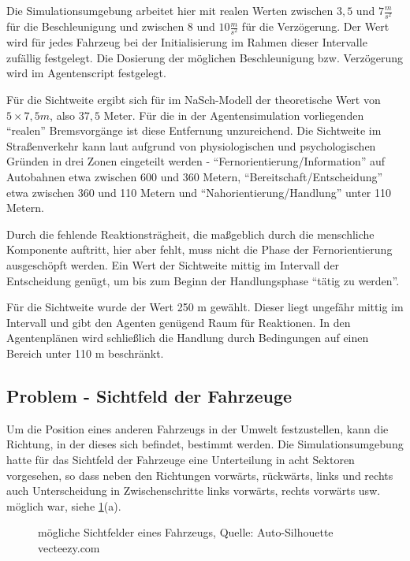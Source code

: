 Die Simulationsumgebung arbeitet hier mit realen Werten zwischen $3,5$ und $7 \frac{m}{s^{2}}$ für die Beschleunigung und zwischen $8$ und $10 \frac{m}{s^{2}}$ für die Verzögerung.
Der Wert wird für jedes Fahrzeug bei der Initialisierung im Rahmen dieser Intervalle zufällig festgelegt.
Die Dosierung der möglichen Beschleunigung bzw. Verzögerung wird im Agentenscript festgelegt.

Für die Sichtweite ergibt sich für im NaSch-Modell der theoretische Wert von $5 \times 7,5 m$, also $37,5$ Meter.
Für die in der Agentensimulation vorliegenden \enquote{realen} Bremsvorgänge ist diese Entfernung unzureichend. 
Die Sichtweite im Straßenverkehr kann laut \cite{sichtweite} aufgrund von physiologischen und psychologischen Gründen in drei Zonen eingeteilt werden - \enquote{Fernorientierung/Information} auf Autobahnen etwa zwischen 600 und 360 Metern, \enquote{Bereitschaft/Entscheidung} etwa zwischen 360 und 110 Metern und \enquote{Nahorientierung/Handlung} unter 110 Metern.

Durch die fehlende Reaktionsträgheit, die maßgeblich durch die menschliche Komponente auftritt, hier aber fehlt, muss nicht die Phase der Fernorientierung ausgeschöpft werden. 
Ein Wert der Sichtweite mittig im Intervall der Entscheidung genügt, um bis zum Beginn der Handlungsphase \enquote{tätig zu werden}.

Für die Sichtweite wurde der Wert 250 m gewählt.
Dieser liegt ungefähr mittig im Intervall und gibt den Agenten genügend Raum für Reaktionen. 
In den Agentenplänen wird schließlich die Handlung durch Bedingungen auf einen Bereich unter 110 m beschränkt.



\subsection{Problem - Sichtfeld der Fahrzeuge}

Um die Position eines anderen Fahrzeugs in der Umwelt festzustellen, kann die Richtung, in der dieses sich befindet, bestimmt werden.
Die Simulationsumgebung hatte für das Sichtfeld der Fahrzeuge eine Unterteilung in acht Sektoren vorgesehen, so dass neben den Richtungen vorwärts, rückwärts, links und rechts auch Unterscheidung in Zwischenschritte links vorwärts, rechts vorwärts usw. möglich war, siehe \cref{figure:car-view-sectors}(a).

\begin{figure}[hptb]
  \centering 
   \qquad 
   \qquad 
  \caption{mögliche Sichtfelder eines Fahrzeugs, Quelle: Auto-Silhouette vecteezy.com} 
  \label{figure:car-view-sectors}
\end{figure}

